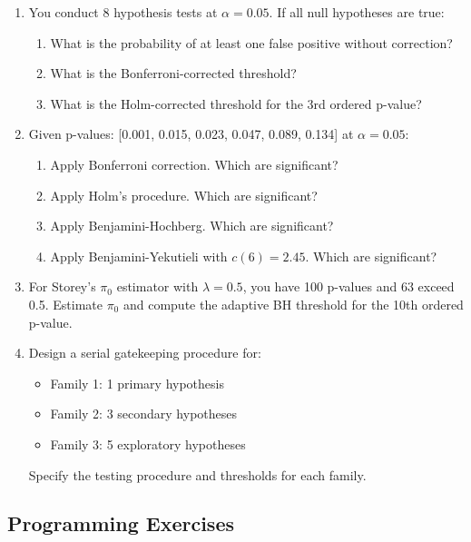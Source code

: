 \begin{enumerate}
    \item You conduct 8 hypothesis tests at $\alpha = 0.05$. If all null hypotheses are true:
    \begin{enumerate}
        \item What is the probability of at least one false positive without correction?
        \item What is the Bonferroni-corrected threshold?
        \item What is the Holm-corrected threshold for the 3rd ordered p-value?
    \end{enumerate}

    \item Given p-values: [0.001, 0.015, 0.023, 0.047, 0.089, 0.134] at $\alpha = 0.05$:
    \begin{enumerate}
        \item Apply Bonferroni correction. Which are significant?
        \item Apply Holm's procedure. Which are significant?
        \item Apply Benjamini-Hochberg. Which are significant?
        \item Apply Benjamini-Yekutieli with $c(6) = 2.45$. Which are significant?
    \end{enumerate}

    \item For Storey's $\pi_0$ estimator with $\lambda = 0.5$, you have 100 p-values and 63 exceed 0.5. Estimate $\pi_0$ and compute the adaptive BH threshold for the 10th ordered p-value.

    \item Design a serial gatekeeping procedure for:
    \begin{itemize}
        \item Family 1: 1 primary hypothesis
        \item Family 2: 3 secondary hypotheses
        \item Family 3: 5 exploratory hypotheses
    \end{itemize}
    Specify the testing procedure and thresholds for each family.
\end{enumerate}

\subsection{Programming Exercises}

